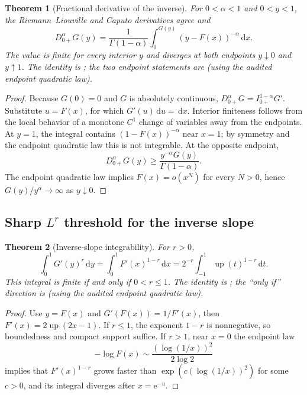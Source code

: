 \documentclass[11pt,oneside]{article}
\newtheorem{theorem}{Theorem}[section]
\theoremstyle{definition}
\theoremstyle{remark}
\newcommand{\Up}{\operatorname{up}}
\newcommand{\dd}{\,\mathrm d}
\newcommand{\e}{\mathrm e}
\newcommand{\1}{\mathbf 1}
\begin{document}
\begin{theorem}[Fractional derivative of the inverse]
\label{p7:thm:inverse-fractional-derivative}
For $0<\alpha<1$ and $0<y<1$, the Riemann--Liouville and Caputo derivatives agree and
\begin{equation}
 D_{0+}^{\alpha}G(y)
 =\frac1{\Gamma(1-\alpha)}
 \int_0^{G(y)}(y-F(x))^{-\alpha}\dd x.
 \label{p7:eq:inverse-fractional-derivative}
\end{equation}
The value is finite for every interior $y$ and diverges at both endpoints
$y\downarrow0$ and $y\uparrow1$.  The identity is \statusproved; the two endpoint
statements are \statusderived{} (using the audited endpoint quadratic law).
\end{theorem}

\begin{proof}
Because $G(0)=0$ and $G$ is absolutely continuous,
$D_{0+}^{\alpha}G=I_{0+}^{1-\alpha}G'$.  Substitute $u=F(x)$, for which
$G'(u)\dd u=\dd x$.  Interior finiteness follows from the local behavior of a monotone
$C^1$ change of variables away from the endpoints.  At $y=1$, the integral contains
$(1-F(x))^{-\alpha}$ near $x=1$; by symmetry and the endpoint quadratic law this is not
integrable.  At the opposite endpoint,
\[
 D_{0+}^{\alpha}G(y)
 \ge \frac{y^{-\alpha}G(y)}{\Gamma(1-\alpha)}.
\]
The endpoint quadratic law implies $F(x)=o(x^N)$ for every $N>0$, hence
$G(y)/y^\alpha\to\infty$ as $y\downarrow0$.
\end{proof}

\subsection{Sharp $L^r$ threshold for the inverse slope}

\begin{theorem}[Inverse-slope integrability]
\label{p7:thm:inverse-slope-Lr}
For $r>0$,
\begin{equation}
 \int_0^1G'(y)^r\dd y
 =\int_0^1F'(x)^{1-r}\dd x
 =2^{-r}\int_{-1}^{1}\Up(t)^{1-r}\dd t.
 \label{p7:eq:inverse-slope-Lr}
\end{equation}
This integral is finite if and only if $0<r\le1$.  The identity is \statusproved; the
``only if'' direction is \statusderived{} (using the audited endpoint quadratic law).
\end{theorem}

\begin{proof}
Use $y=F(x)$ and $G'(F(x))=1/F'(x)$, then
$F'(x)=2\Up(2x-1)$.  If $r\le1$, the exponent $1-r$ is nonnegative, so boundedness and compact
support suffice.  If $r>1$, near $x=0$ the endpoint law
\[
 -\log F(x)\sim\frac{(\log(1/x))^2}{2\log2}
\]
implies that $F'(x)^{1-r}$ grows faster than
$\exp(c(\log(1/x))^2)$ for some $c>0$, and its integral diverges after $x=\e^{-u}$.
\end{proof}
\end{document}
